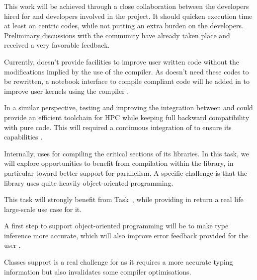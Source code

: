 \begin{workpackage}
\begin{tasklist}
\begin{task}[title=Pythran-Cython convergence,id=pythran-cython]
  This work will be achieved through a close collaboration between the \Pythran
  developers hired for \TheProject and \Cython developers involved in the \Sage
  project. It should quicken \Sage execution time at least on \Numpy centric
  codes, while not putting an extra burden on the developers.  Preliminary
  discussions with the \Cython community have already taken place and received a
  very favorable feedback.
\end{task}

\begin{task}[title=\Pythran for \Sage and \Sage Users,id=pythran-sage]

  Currently, \Sage doesn't provide facilities to improve user written
  \Python code without the modifications implied by the use of the \Cython
  compiler. As \Pythran doesn't need these codes to be rewritten, a notebook
  interface to compile \Pythran compliant code will he added in \Sage to
  improve user kernels using the \Pythran compiler .

  In a similar perspective, testing and improving the integration between
   and \Pythran could provide an efficient toolchain for HPC
  while keeping full backward compatibility with pure \Python code. This will
  required a continuous integration of \Pythran to ensure its capabilities
  .

  Internally, \Sage uses \Cython for compiling the critical sections of
  its libraries. In this task, we will explore opportunities to
  benefit from \Pythran compilation within the \Sage library, in
  particular toward better support for parallelism. A specific
  challenge is that the \Sage library uses quite heavily
  object-oriented programming.

  This task will strongly benefit from Task~,
  while providing in return a real life large-scale use case for it.

  A first step to support object-oriented programming will be to make
  \Pythran type inference more accurate, which will also improve error
  feedback provided for the user .
\end{task}

\begin{task}[title=Explorative task: Add support for classes in \Pythran.]
  Classes support is a real challenge for \Pythran as it requires a more
  accurate typing information but also invalidates some compiler optimisations.


\end{task}
\end{tasklist}
\end{workpackage}
